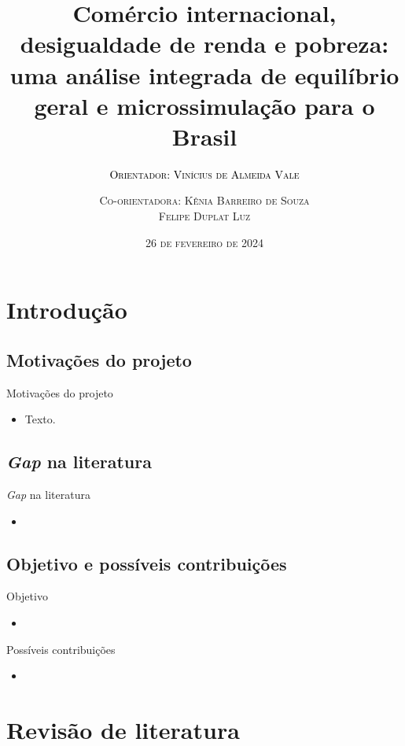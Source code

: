 \documentclass[10pt]{sintefbeamer}
\title{\large Comércio internacional, desigualdade de renda e pobreza: uma análise integrada de equilíbrio geral e microssimulação para o Brasil}
\subtitle{\textsc{\textcolor{black}{Orientador: Vinícius de Almeida Vale}}}
\author{\textsc{Co-orientadora: Kênia Barreiro de Souza \\ Felipe Duplat Luz}}
\date{\textsc{26 de fevereiro de 2024}}
\begin{document}
\maketitle

\section{Introdução}

\subsection{Motivações do projeto}

\begin{frame}{Motivações do projeto}
	\begin{itemize}[<+->]
		\item Texto.
	\end{itemize}
\end{frame}


\subsection{\textit{Gap} na literatura}

\begin{frame}{\textit{Gap} na literatura}
	\begin{itemize}[<+->]
		\item 
	\end{itemize}
\end{frame}


\subsection{Objetivo e possíveis contribuições}

\begin{frame}{Objetivo}
	\begin{itemize}[<+->]
		\item 
	\end{itemize}
\end{frame}

\begin{frame}{Possíveis contribuições}
	\begin{itemize}
		\item 
	\end{itemize}
\end{frame}



\section{Revisão de literatura}
\end{document}

